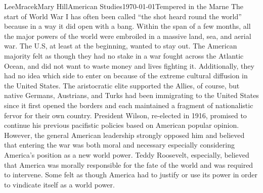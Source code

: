 \documentclass{article}
\begin{document}
\begin{mla}{Lee}{Mracek}{Mary Hill}{American Studies}{\today}{Tempered in the Marne}
    The start of World War I has often been called ``the shot heard round the world'' because in a way it did open with a bang. Within the span of a few months, all the major powers of the world were embroiled in a massive land, sea, and aerial war. The U.S, at least at the beginning, wanted to stay out. The American majority felt as though they had no stake in a war fought across the Atlantic Ocean, and did not want to waste money and lives fighting it. Additionally, they had no idea which side to enter on because of the extreme cultural diffusion in the United States. The aristocratic elite supported the Allies, of course, but native Germans, Austrians, and Turks had been immigrating to the United States since it first opened the borders and each maintained a fragment of nationalistic fervor for their own country. President Wilson, re-elected in 1916, promised to continue his previous pacifistic policies based on American popular opinion. However, the general American leadership strongly opposed him and believed that entering the war was both moral and necessary especially considering America's position as a new world power. Teddy Roosevelt, especially, believed that America was morally responsible for the fate of the world and was required to intervene. Some felt as though America had to justify or use its power in order to vindicate itself as a world power.


\end{mla}
\end{document}
